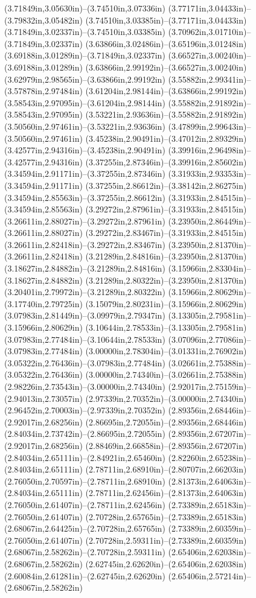 (3.71849in,3.05630in)--(3.74510in,3.07336in) (3.77171in,3.04433in)--(3.79832in,3.05482in) (3.74510in,3.03385in)--(3.77171in,3.04433in) (3.71849in,3.02337in)--(3.74510in,3.03385in) (3.70962in,3.01710in)--(3.71849in,3.02337in) (3.63866in,3.02486in)--(3.65196in,3.01248in) (3.69188in,3.01289in)--(3.71849in,3.02337in) (3.66527in,3.00240in)--(3.69188in,3.01289in) (3.63866in,2.99192in)--(3.66527in,3.00240in) (3.62979in,2.98565in)--(3.63866in,2.99192in) (3.55882in,2.99341in)--(3.57878in,2.97484in) (3.61204in,2.98144in)--(3.63866in,2.99192in) (3.58543in,2.97095in)--(3.61204in,2.98144in) (3.55882in,2.91892in)--(3.58543in,2.97095in) (3.53221in,2.93636in)--(3.55882in,2.91892in) (3.50560in,2.97461in)--(3.53221in,2.93636in) (3.47899in,2.99643in)--(3.50560in,2.97461in) (3.45238in,2.90491in)--(3.47012in,2.89329in) (3.42577in,2.94316in)--(3.45238in,2.90491in) (3.39916in,2.96498in)--(3.42577in,2.94316in) (3.37255in,2.87346in)--(3.39916in,2.85602in) (3.34594in,2.91171in)--(3.37255in,2.87346in) (3.31933in,2.93353in)--(3.34594in,2.91171in) (3.37255in,2.86612in)--(3.38142in,2.86275in) (3.34594in,2.85563in)--(3.37255in,2.86612in) (3.31933in,2.84515in)--(3.34594in,2.85563in) (3.29272in,2.87961in)--(3.31933in,2.84515in) (3.26611in,2.88027in)--(3.29272in,2.87961in) (3.23950in,2.86449in)--(3.26611in,2.88027in) (3.29272in,2.83467in)--(3.31933in,2.84515in) (3.26611in,2.82418in)--(3.29272in,2.83467in) (3.23950in,2.81370in)--(3.26611in,2.82418in) (3.21289in,2.84816in)--(3.23950in,2.81370in) (3.18627in,2.84882in)--(3.21289in,2.84816in) (3.15966in,2.83304in)--(3.18627in,2.84882in) (3.21289in,2.80322in)--(3.23950in,2.81370in) (3.20401in,2.79972in)--(3.21289in,2.80322in) (3.15966in,2.80629in)--(3.17740in,2.79725in) (3.15079in,2.80231in)--(3.15966in,2.80629in) (3.07983in,2.81449in)--(3.09979in,2.79347in) (3.13305in,2.79581in)--(3.15966in,2.80629in) (3.10644in,2.78533in)--(3.13305in,2.79581in) (3.07983in,2.77484in)--(3.10644in,2.78533in) (3.07096in,2.77086in)--(3.07983in,2.77484in) (3.00000in,2.78304in)--(3.01331in,2.76902in) (3.05322in,2.76436in)--(3.07983in,2.77484in) (3.02661in,2.75388in)--(3.05322in,2.76436in) (3.00000in,2.74340in)--(3.02661in,2.75388in) (2.98226in,2.73543in)--(3.00000in,2.74340in) (2.92017in,2.75159in)--(2.94013in,2.73057in) (2.97339in,2.70352in)--(3.00000in,2.74340in) (2.96452in,2.70003in)--(2.97339in,2.70352in) (2.89356in,2.68446in)--(2.92017in,2.68256in) (2.86695in,2.72055in)--(2.89356in,2.68446in) (2.84034in,2.73742in)--(2.86695in,2.72055in) (2.89356in,2.67207in)--(2.92017in,2.68256in) (2.88469in,2.66858in)--(2.89356in,2.67207in) (2.84034in,2.65111in)--(2.84921in,2.65460in) (2.82260in,2.65238in)--(2.84034in,2.65111in) (2.78711in,2.68910in)--(2.80707in,2.66203in) (2.76050in,2.70597in)--(2.78711in,2.68910in) (2.81373in,2.64063in)--(2.84034in,2.65111in) (2.78711in,2.62456in)--(2.81373in,2.64063in) (2.76050in,2.61407in)--(2.78711in,2.62456in) (2.73389in,2.65183in)--(2.76050in,2.61407in) (2.70728in,2.65765in)--(2.73389in,2.65183in) (2.68067in,2.64425in)--(2.70728in,2.65765in) (2.73389in,2.60359in)--(2.76050in,2.61407in) (2.70728in,2.59311in)--(2.73389in,2.60359in) (2.68067in,2.58262in)--(2.70728in,2.59311in) (2.65406in,2.62038in)--(2.68067in,2.58262in) (2.62745in,2.62620in)--(2.65406in,2.62038in) (2.60084in,2.61281in)--(2.62745in,2.62620in) (2.65406in,2.57214in)--(2.68067in,2.58262in) 
